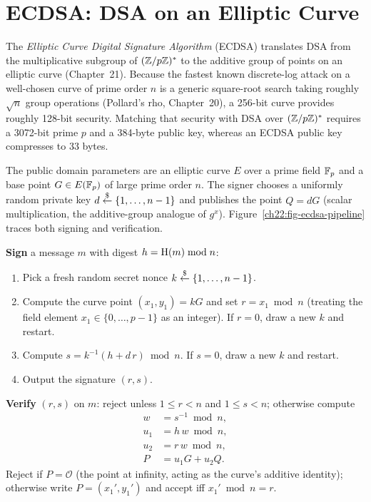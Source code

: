 \section{ECDSA: DSA on an Elliptic Curve}
\label{ch22:ecdsa}

The \emph{Elliptic Curve Digital Signature Algorithm} (ECDSA) translates DSA from the multiplicative subgroup of $(\mathbb{Z}/p\mathbb{Z})^{*}$ to the additive group of points on an elliptic curve (Chapter~21). Because the fastest known discrete-log attack on a well-chosen curve of prime order $n$ is a generic square-root search taking roughly $\sqrt{n}$ group operations (Pollard's rho, Chapter~20), a 256-bit curve provides roughly 128-bit security. Matching that security with DSA over $(\mathbb{Z}/p\mathbb{Z})^{*}$ requires a 3072-bit prime $p$ and a 384-byte public key, whereas an ECDSA public key compresses to 33 bytes.

The public domain parameters are an elliptic curve $E$ over a prime field $\mathbb{F}_p$ and a base point $G \in E(\mathbb{F}_p)$ of large prime order $n$. The signer chooses a uniformly random private key $d \stackrel{\$}{\gets} \{1,\dots,n-1\}$ and publishes the point $Q = dG$ (scalar multiplication, the additive-group analogue of $g^x$). Figure~\ref{ch22:fig-ecdsa-pipeline} traces both signing and verification.

\textbf{Sign} a message $m$ with digest $h = \operatorname{H}(m) \bmod n$:
\begin{enumerate}
  \item Pick a fresh random secret nonce $k \stackrel{\$}{\gets} \{1,\dots,n-1\}$.
  \item Compute the curve point $(x_1, y_1) = kG$ and set $r = x_1 \bmod n$ (treating the field element $x_1 \in \{0,\dots,p-1\}$ as an integer). If $r = 0$, draw a new $k$ and restart.
  \item Compute $s = k^{-1}(h + d\,r) \bmod n$. If $s = 0$, draw a new $k$ and restart.
  \item Output the signature $(r, s)$.
\end{enumerate}

\textbf{Verify} $(r,s)$ on $m$: reject unless $1 \le r < n$ and $1 \le s < n$; otherwise compute
\begin{align*}
  w &= s^{-1}\bmod n, \\
  u_1 &= h\,w \bmod n, \\
  u_2 &= r\,w \bmod n, \\
  P &= u_1 G + u_2 Q.
\end{align*}
Reject if $P = \mathcal{O}$ (the point at infinity, acting as the curve's additive identity); otherwise write $P = (x_1', y_1')$ and accept iff $x_1' \bmod n = r$.

